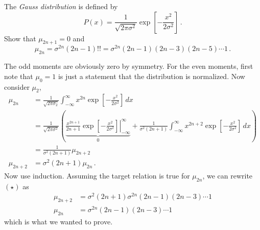 

The \emph{Gauss distribution} is defined by
\begin{equation*}
  P(x) = \frac{1}{\sqrt{2\pi \sigma^2}} \exp \left[ - \frac{x^2}{2 \sigma^2} \right]
  \, .
\end{equation*}
Show that $\mu_{2n+1} = 0$ and
\begin{equation*}
  \mu_{2n} = \sigma^{2n} (2n-1)!! = \sigma^{2n} (2n-1)(2n-3)(2n-5)\cdots 1
  \, .
\end{equation*}


The odd moments are obviously zero by symmetry.
For the even moments, first note that $\mu_0 = 1$ is just a statement that the distribution is normalized.
Now consider $\mu_2$,
\begin{align*}
  \mu_{2n}
  &= \frac{1}{\sqrt{2\pi \sigma_2}} \int_{-\infty}^\infty x^{2n} \exp \left[ - \frac{x^2}{2 \sigma^2} \right] \, dx \\
  &= \frac{1}{\sqrt{2 \pi \sigma^2}}
  \left(
    \underbrace{
      \left. \frac{x^{2n + 1}}{2n+1} \exp \left[ - \frac{x^2}{2 \sigma^2} \right]
      \right\rvert_{-\infty}^\infty
    }_0
    + \frac{1}{\sigma^2 (2n + 1)}
    \int_{-\infty}^\infty x^{2n+2} \exp \left[ - \frac{x^2}{2 \sigma^2} \right] \, dx
  \right) \\
  &= \frac{1}{\sigma^2 (2n + 1)} \mu_{2n + 2} \\
  \mu_{2n + 2} &= \sigma^2 (2n + 1) \mu_{2n}
  \, . \tag{$\star$}
\end{align*}
Now use induction.
Assuming the target relation is true for $\mu_{2n}$, we can rewrite $(\star)$ as
\begin{align*}
  \mu_{2n + 2} &= \sigma^2 (2n + 1) \sigma^{2n} (2n - 1)(2n - 3)\cdots 1 \\
  \mu_{2n} &= \sigma^{2n} (2n - 1)(2n - 3) \cdots 1
\end{align*}
which is what we wanted to prove.
